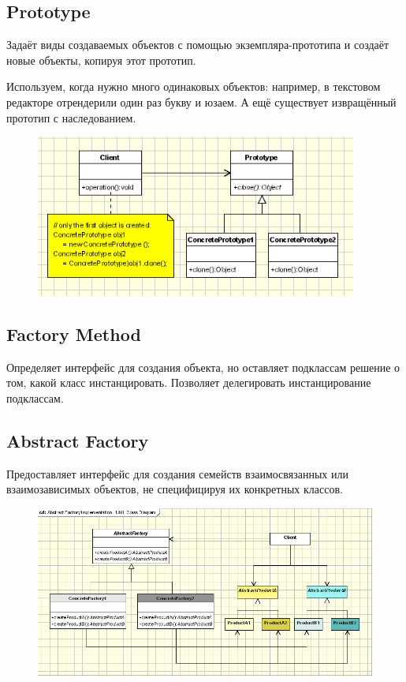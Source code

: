 \documentclass[11pt,a4paper]{article}
\begin{document}
\subsection{Prototype}
Задаёт виды создаваемых объектов с помощью экземпляра-прототипа и создаёт новые объекты, копируя этот прототип.

Используем, когда нужно много одинаковых объектов: например, в текстовом редакторе отрендерили один раз букву и юзаем. А ещё существует извращённый прототип с наследованием.

\begin{figure}[H]
	\centering
	\includegraphics[width=300pt]{pics/prototype-pattern.png}
\end{figure}

\subsection{Factory Method}
Определяет интерфейс для создания объекта, но оставляет подклассам решение о том, какой класс инстанцировать. Позволяет делегировать инстанцирование подклассам.

\subsection{Abstract Factory}
Предоставляет интерфейс для создания семейств взаимосвязанных или взаимозависимых объектов, не специфицируя их конкретных классов.

\begin{figure}[H]
	\centering
	\includegraphics[width=450pt]{pics/abstract-factory-pattern.png}
\end{figure}
\end{document}

